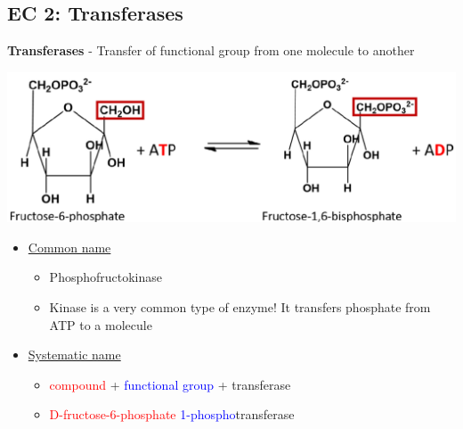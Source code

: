 \documentclass[10pt]{article}
\begin{document}
\subsection*{EC 2: Transferases}
\textbf{Transferases} - Transfer of functional group from one molecule to another
\begin{center}
    \includegraphics*[width=\textwidth]{L2_4.png} 
\end{center}
\begin{itemize}
    \item \underline{Common name}
    \begin{itemize}
        \item Phosphofructokinase
        \item Kinase is a very common type of enzyme!  It transfers phosphate from ATP to a molecule
    \end{itemize}
    \item \underline{Systematic name}
    \begin{itemize}
        \item \textcolor{red}{compound} + \textcolor{blue}{functional group} + transferase
        \item \textcolor{red}{D-fructose-6-phosphate} \textcolor{blue}{1-phospho}transferase
    \end{itemize}
\end{itemize}
\end{document}
